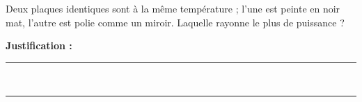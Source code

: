 Deux plaques identiques sont à la même température ; l'une est peinte en noir mat, l'autre est polie comme un miroir. Laquelle rayonne le plus de puissance ?

\choices

\noindent\textbf{Justification :} \hrulefill \\[2.5ex]
\rule{\linewidth}{0.4pt} \\[2.5ex]
\rule{\linewidth}{0.4pt}
\vfill
